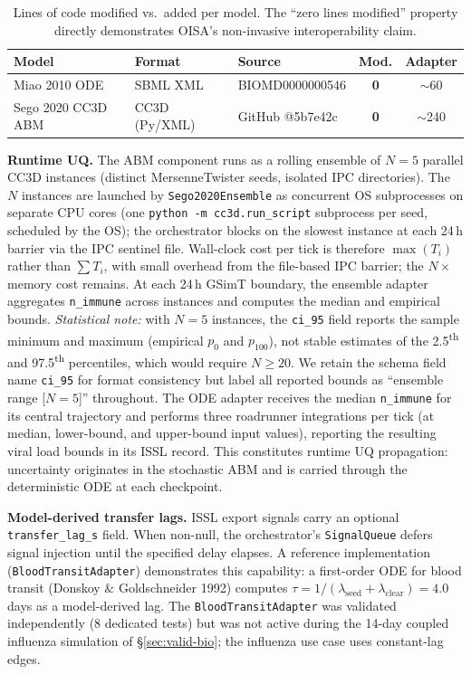 \documentclass[conference,letterpaper,10pt]{IEEEtran}
\begin{document}
\begin{table}[t]
\centering
\caption{Lines of code modified vs.\ added per model. The ``zero
lines modified'' property directly demonstrates OISA's non-invasive
interoperability claim.}
\label{tab:adapter}
\renewcommand{\arraystretch}{1.0}
\scriptsize
\setlength{\tabcolsep}{3pt}
\begin{tabular}{@{}lllcc@{}}
\toprule
\textbf{Model}     & \textbf{Format}   & \textbf{Source}   & \textbf{Mod.} & \textbf{Adapter}\\
\midrule
Miao 2010 ODE      & SBML XML          & BIOMD0000000546   & \textbf{0}    & $\sim$60\\
Sego 2020 CC3D ABM & CC3D (Py/XML)     & GitHub @5b7e42c   & \textbf{0}    & $\sim$240\\
\bottomrule
\end{tabular}
\end{table}

\textbf{Runtime UQ.} The ABM component runs as a rolling ensemble of
$N\!=\!5$ parallel CC3D instances (distinct MersenneTwister seeds,
isolated IPC directories). The $N$ instances are launched by
\texttt{Sego2020Ensemble} as concurrent OS subprocesses on separate
CPU cores (one \texttt{python -m cc3d.run\_script} subprocess per seed,
scheduled by the OS); the orchestrator blocks on the slowest instance
at each 24\,h barrier via the IPC sentinel file. Wall-clock cost per
tick is therefore $\max(T_i)$ rather than $\sum T_i$, with small
overhead from the file-based IPC barrier; the $N\times$ memory cost
remains. At each 24\,h GSimT boundary, the ensemble adapter aggregates
\texttt{n\_immune} across instances and computes the median and
empirical bounds. \emph{Statistical note:} with $N\!=\!5$ instances,
the \texttt{ci\_95} field reports the sample minimum and maximum
(empirical $p_0$ and $p_{100}$), not stable estimates of the
2.5\textsuperscript{th} and 97.5\textsuperscript{th} percentiles, which
would require $N\!\geq\!20$. We retain the schema field name
\texttt{ci\_95} for format consistency but label all reported bounds as
``ensemble range [$N\!=\!5$]'' throughout. The ODE adapter receives the
median \texttt{n\_immune} for its central trajectory and performs three
roadrunner integrations per tick (at median, lower-bound, and
upper-bound input values), reporting the resulting viral load bounds
in its ISSL record. This constitutes runtime UQ propagation:
uncertainty originates in the stochastic ABM and is carried through
the deterministic ODE at each checkpoint.

\textbf{Model-derived transfer lags.} ISSL export signals carry an
optional \texttt{transfer\_lag\_s} field. When non-null, the
orchestrator's \texttt{SignalQueue} defers signal injection until the
specified delay elapses. A reference implementation
(\texttt{BloodTransitAdapter}) demonstrates this capability: a
first-order ODE for blood transit (Donskoy \& Goldschneider 1992)
computes $\tau=1/(\lambda_{\text{seed}}+\lambda_{\text{clear}})=4.0$
days as a model-derived lag. The \texttt{BloodTransitAdapter} was
validated independently (8 dedicated tests) but was not active during
the 14-day coupled influenza simulation of \S\ref{sec:valid-bio}; the
influenza use case uses constant-lag edges.
\end{document}
